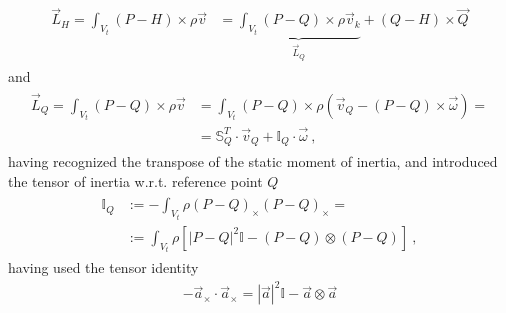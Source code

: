 \documentclass[letterpaper,10pt,english]{jupyterBook}
\begin{document}
\sphinxAtStartPar
{}
\begin{equation*}
\begin{split}\begin{aligned}
  \vec{L}_H = \int_{V_t} (P-H) \times  \rho \vec{v}
  & = \underbrace{\int_{V_t}(P-Q) \times \rho \vec{v}_k}_{\vec{L}_Q} + (Q - H) \times \vec{Q}
\end{aligned}\end{split}
\end{equation*}
\sphinxAtStartPar
and
\begin{equation*}
\begin{split}\begin{aligned}
\vec{L}_Q = \int_{V_t} (P - Q) \times \rho \vec{v}
 & = \int_{V_t} (P - Q) \times \rho \left( \vec{v}_Q - (P - Q) \times \vec{\omega} \right) = \\
 & = \mathbb{S}_Q^T \cdot \vec{v}_Q + \mathbb{I}_Q \cdot \vec{\omega}  \ ,
\end{aligned}\end{split}
\end{equation*}
\sphinxAtStartPar
having recognized the transpose of the static moment of inertia, and introduced the tensor of inertia w.r.t. reference point \(Q\)
\begin{equation*}
\begin{split}\begin{aligned}
  \mathbb{I}_Q
  & := - \int_{V_t} \rho \left( P - Q \right)_{\times} \left( P - Q \right)_{\times}  = \\
  & := \int_{V_t} \rho \left[ |P-Q|^2 \mathbb{I} - (P-Q) \otimes (P-Q) \right] \ ,
\end{aligned}\end{split}
\end{equation*}
\sphinxAtStartPar
having used the tensor identity
\begin{equation*}
\begin{split}- \vec{a}_{\times} \cdot \vec{a}_{\times} = |\vec{a}|^2 \mathbb{I} - \vec{a} \otimes \vec{a}\end{split}
\end{equation*}
\end{document}
